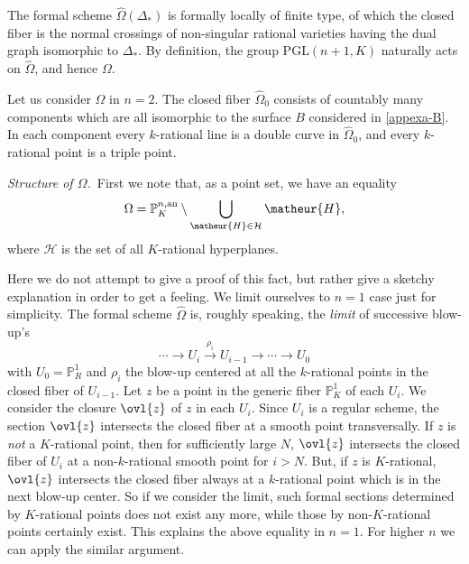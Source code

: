 The formal scheme $\widehat{\Omega}(\Delta_{\ast})$ is formally locally of
finite type, of which the closed fiber is the normal crossings of
non-singular rational varieties having the dual graph isomorphic to 
$\Delta_{\ast}$.
By definition, the group $\mathrm{PGL}(n+1,K)$ naturally acts on 
$\widehat{\Omega}$, and hence $\Omega$.

\begin{appexa}
Let us consider $\widehat{\Omega}$ in $n=2$. 
The closed fiber $\widehat{\Omega}_0$ consists of countably many 
components which are all isomorphic to the surface $B$ considered 
in \ref{appexa-B}. 
In each component every $k$-rational line is a double curve in 
$\widehat{\Omega}_0$, and every $k$-rational point is a triple point.
\end{appexa}

{\it Structure of $\Omega$.}\ 
First we note that, as a point set, we have an equality
$$
\Omega=\mathbb{P}^{n,\mathrm{an}}_K\setminus\bigcup_{\matheur{H}\in
\mathcal{H}}\matheur{H},
$$
where $\mathcal{H}$ is the set of all $K$-rational hyperplanes.

Here we do not attempt to give a proof of this fact, but rather give a 
sketchy explanation in order to get a feeling.
We limit ourselves to $n=1$ case just for simplicity.
The formal scheme $\widehat{\Omega}$ is, roughly speaking, the {\it limit}
of successive blow-up's 
$$
\cdots\longrightarrow U_i\stackrel{\rho_i}{\longrightarrow}U_{i-1}
\longrightarrow\cdots\longrightarrow U_0
$$
with $U_0=\mathbb{P}^1_R$ and $\rho_i$ the blow-up centered at all the 
$k$-rational points in the closed fiber of $U_{i-1}$.
Let $z$ be a point in the generic fiber $\mathbb{P}^1_K$ of each $U_i$.
We consider the closure $\ovl{z}$ of $z$ in each $U_i$.
Since $U_i$ is a regular scheme, the section $\ovl{z}$ intersects the
closed fiber at a smooth point transversally. 
If $z$ is {\it not} a $K$-rational point, then for sufficiently large 
$N$, $\ovl{z}$ intersects the closed fiber of $U_i$ at a non-$k$-rational
smooth point for $i>N$.
But, if $z$ is $K$-rational, $\ovl{z}$ intersects the closed
fiber always at a $k$-rational point which is in the next blow-up center.
So if we consider the limit, such formal sections determined by $K$-rational 
points does not exist any more, while those by non-$K$-rational points 
certainly exist.
This explains the above equality in $n=1$.
For higher $n$ we can apply the similar argument.

